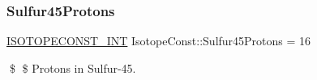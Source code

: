 \subsubsection{\texorpdfstring{Sulfur45\+Protons}{Sulfur45Protons}}
{\footnotesize\ttfamily \mbox{\hyperlink{group___isotope_const-_macros_ga5f18360b3e99483a35c32d789e62621c}{I\+S\+O\+T\+O\+P\+E\+C\+O\+N\+S\+T\+\_\+\+I\+NT}} Isotope\+Const\+::\+Sulfur45\+Protons = 16}

\$ \$ Protons in Sulfur-\/45. 